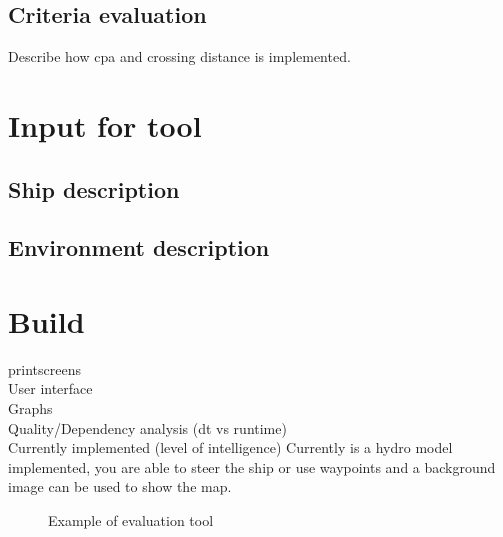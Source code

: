 \subsection{Criteria evaluation}
Describe how cpa and crossing distance is implemented.

\section{Input for tool}
\subsection{Ship description}

\subsection{Environment description}


\section{Build}
printscreens\\
User interface\\
Graphs\\
Quality/Dependency analysis (dt vs runtime)\\
Currently implemented (level of intelligence)
Currently is a hydro model implemented, you are able to steer the ship or use waypoints and a background image can be used to show the map.

\begin{figure}[hb]
	\centering
	\caption{Example of evaluation tool}
	\label{fig:printscreen-tool}
\end{figure}